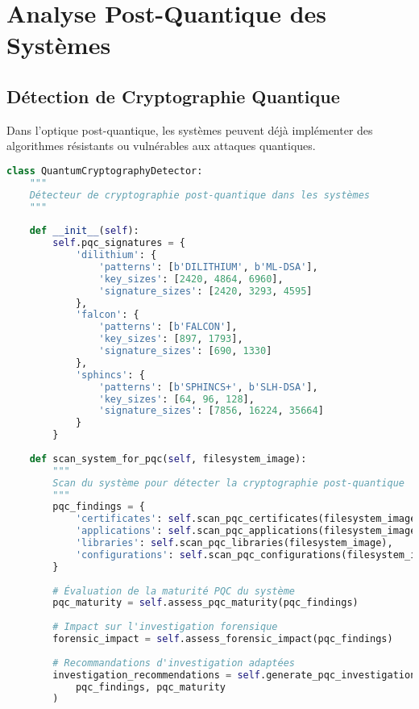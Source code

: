 \section{Analyse Post-Quantique des Systèmes}

\subsection{Détection de Cryptographie Quantique}

Dans l'optique post-quantique, les systèmes peuvent déjà implémenter des algorithmes résistants ou vulnérables aux attaques quantiques.

\begin{lstlisting}[language=Python, caption=Détecteur de cryptographie quantique dans les systèmes]
class QuantumCryptographyDetector:
    """
    Détecteur de cryptographie post-quantique dans les systèmes
    """
    
    def __init__(self):
        self.pqc_signatures = {
            'dilithium': {
                'patterns': [b'DILITHIUM', b'ML-DSA'],
                'key_sizes': [2420, 4864, 6960],
                'signature_sizes': [2420, 3293, 4595]
            },
            'falcon': {
                'patterns': [b'FALCON'],
                'key_sizes': [897, 1793],
                'signature_sizes': [690, 1330]
            },
            'sphincs': {
                'patterns': [b'SPHINCS+', b'SLH-DSA'],
                'key_sizes': [64, 96, 128],
                'signature_sizes': [7856, 16224, 35664]
            }
        }
        
    def scan_system_for_pqc(self, filesystem_image):
        """
        Scan du système pour détecter la cryptographie post-quantique
        """
        pqc_findings = {
            'certificates': self.scan_pqc_certificates(filesystem_image),
            'applications': self.scan_pqc_applications(filesystem_image),
            'libraries': self.scan_pqc_libraries(filesystem_image),
            'configurations': self.scan_pqc_configurations(filesystem_image)
        }
        
        # Évaluation de la maturité PQC du système
        pqc_maturity = self.assess_pqc_maturity(pqc_findings)
        
        # Impact sur l'investigation forensique
        forensic_impact = self.assess_forensic_impact(pqc_findings)
        
        # Recommandations d'investigation adaptées
        investigation_recommendations = self.generate_pqc_investigation_strategy(
            pqc_findings, pqc_maturity
        )
        

\end{lstlisting}

